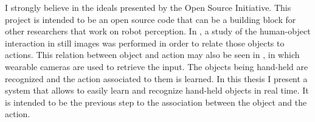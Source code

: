 


I strongly believe in the ideals presented by the Open Source Initiative. 
This project is intended to be an open source code that can be a building block for other researchers that work on robot perception.
	In \cite{Delaitre}, a study of the human-object interaction in still images was performed in order to relate those objects to actions. 
	This relation between object and action may also be seen in \cite{Fathi}, in which wearable cameras are used to retrieve the input. 
	The objects being hand-held are recognized and the action associated to them is learned. 
	In this thesis I present a system that allows to easily learn and recognize hand-held objects in real time. 
	It is intended to be the previous step to the association between the object and the action. 



